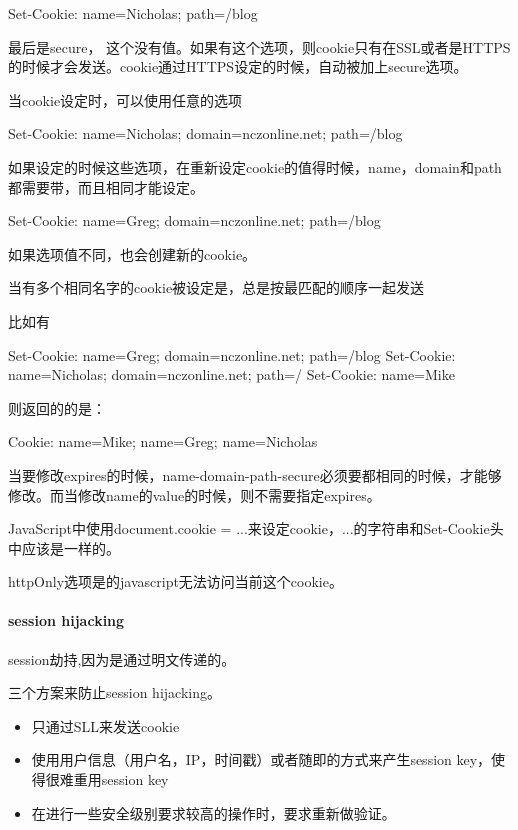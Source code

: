 \begin{HTML5}
Set-Cookie: name=Nicholas; path=/blog
\end{HTML5}

最后是secure， 这个没有值。如果有这个选项，则cookie只有在SSL或者是HTTPS的时候才会发送。cookie通过HTTPS设定的时候，自动被加上secure选项。

当cookie设定时，可以使用任意的选项
\begin{HTML5}
Set-Cookie: name=Nicholas; domain=nczonline.net; path=/blog
\end{HTML5}
如果设定的时候这些选项，在重新设定cookie的值得时候，name，domain和path都需要带，而且相同才能设定。
\begin{HTML5}
Set-Cookie: name=Greg; domain=nczonline.net; path=/blog
\end{HTML5}
如果选项值不同，也会创建新的cookie。

当有多个相同名字的cookie被设定是，总是按最匹配的顺序一起发送

比如有
\begin{HTML5}
Set-Cookie: name=Greg; domain=nczonline.net; path=/blog
Set-Cookie: name=Nicholas; domain=nczonline.net; path=/
Set-Cookie: name=Mike
\end{HTML5}

则返回的的是：

\begin{HTML5}
Cookie: name=Mike; name=Greg; name=Nicholas
\end{HTML5}

当要修改expires的时候，name-domain-path-secure必须要都相同的时候，才能够修改。而当修改name的value的时候，则不需要指定expires。

JavaScript中使用document.cookie = ...来设定cookie，...的字符串和Set-Cookie头中应该是一样的。

httpOnly选项是的javascript无法访问当前这个cookie。


\paragraph{session hijacking} session劫持,因为是通过明文传递的。

三个方案来防止session hijacking。
\begin{itemize}

\item 只通过SLL来发送cookie
\item 使用用户信息（用户名，IP，时间戳）或者随即的方式来产生session key，使得很难重用session key
\item 在进行一些安全级别要求较高的操作时，要求重新做验证。
\end{itemize}


